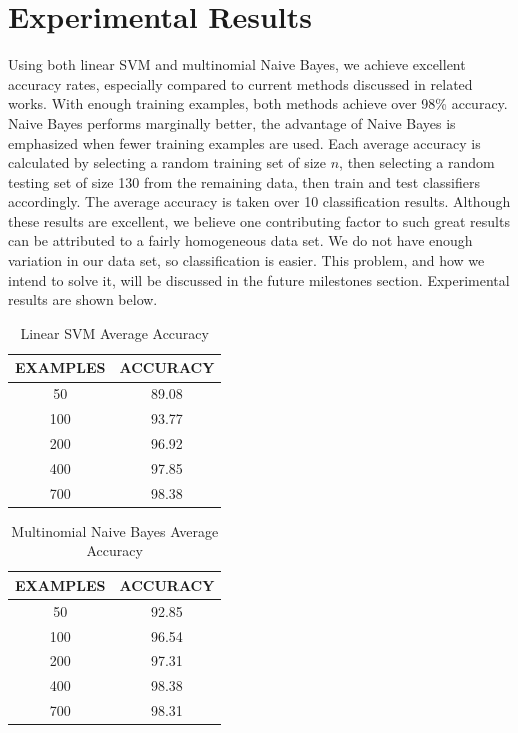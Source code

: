 \documentclass{article} %
\begin{document}
\section{Experimental Results}
Using both linear SVM and multinomial Naive Bayes, we achieve excellent accuracy rates, especially compared to current methods discussed in related works. With enough training examples, both methods achieve over 98\% accuracy. Naive Bayes performs marginally better, the advantage of Naive Bayes is emphasized when fewer training examples are used. Each average accuracy is calculated by selecting a random training set of size $n$, then selecting a random testing set of size 130 from the remaining data, then train and test classifiers accordingly. The average accuracy is taken over 10 classification results. Although these results are excellent, we believe one contributing factor to such great results can be attributed to a fairly homogeneous data set. We do not have enough variation in our data set, so classification is easier. This problem, and how we intend to solve it, will be discussed in the future milestones section. Experimental results are shown below.

\begin{table}[hp]
\caption{Linear SVM Average Accuracy}
\begin{center}
\begin{tabular}{c|c}
{\bf EXAMPLES}  &{\bf ACCURACY}
\\ \hline
50              &89.08 \\
100             &93.77 \\
200             &96.92 \\
400             &97.85 \\
700             &98.38 \\
\end{tabular}
\end{center}
\end{table}

\begin{table}[hp]
\caption{Multinomial Naive Bayes Average Accuracy}
\begin{center}
\begin{tabular}{c|c}
{\bf EXAMPLES}  &{\bf ACCURACY}
\\ \hline 
50              &92.85 \\
100             &96.54 \\
200             &97.31 \\
400             &98.38 \\
700             &98.31 \\
\end{tabular}
\end{center}
\end{table}
\end{document}
